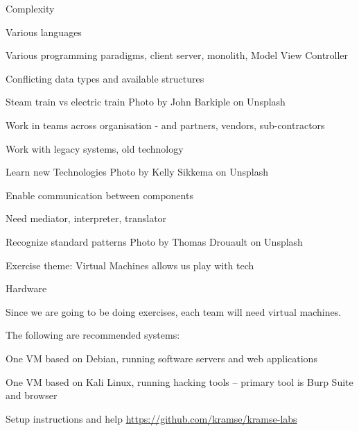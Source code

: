 \documentclass[Screen16to9,17pt]{foils}
\begin{document}


\begin{list2}
\item Complexity
\item Various languages
\item Various programming paradigms, client server, monolith, Model View Controller
\item Conflicting data types and available structures
\item Steam train vs electric train \hfill Photo by John Barkiple on Unsplash

\end{list2}






\begin{list2}
\item Work in teams across organisation - and partners, vendors, sub-contractors
\item Work with legacy systems, old technology
\item Learn new Technologies \hfill Photo by Kelly Sikkema on Unsplash
\end{list2}







\begin{list2}
\item Enable communication between components
\item Need mediator, interpreter, translator
\item Recognize standard patterns \hfill Photo by Thomas Drouault on Unsplash
\end{list2}



Exercise theme: Virtual Machines allows us play with tech

Hardware

Since we are going to be doing exercises, each team will need virtual machines.

The following are recommended systems:
\begin{list2}
\item One VM based on Debian, running software servers and web applications
\item One VM based on Kali Linux, running hacking tools -- primary tool is Burp Suite and browser
\item Setup instructions and help \url{https://github.com/kramse/kramse-labs}
\end{list2}
\end{document}
